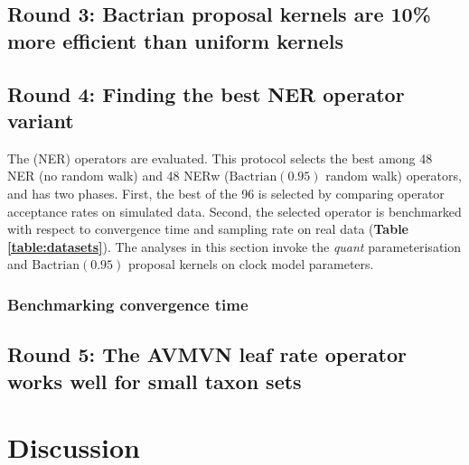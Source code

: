 \documentclass[10pt,letterpaper]{article}
\begin{document}



\subsection*{Round 3: Bactrian proposal kernels are 10\% more efficient than uniform kernels}



\subsection*{Round 4: Finding the best NER operator variant}

The \textbf{} (NER) operators are evaluated. This protocol selects the best among 48 NER (no random walk) and 48 NERw ($\text{Bactrian}(0.95)$ random walk) operators, and has two phases. First, the best of the 96 is selected by comparing operator acceptance rates on simulated data. Second, the selected operator is benchmarked with respect to convergence time and sampling rate on real data (\textbf{Table \ref{table:datasets}}). The analyses in this section invoke the \textit{quant} parameterisation and $\text{Bactrian}(0.95)$ proposal kernels on clock model parameters.







\subsubsection*{Benchmarking convergence time}




\subsection*{Round 5: The AVMVN leaf rate operator works well for small taxon sets}





\section*{Discussion} \label{sect:discussion}


\end{document}
